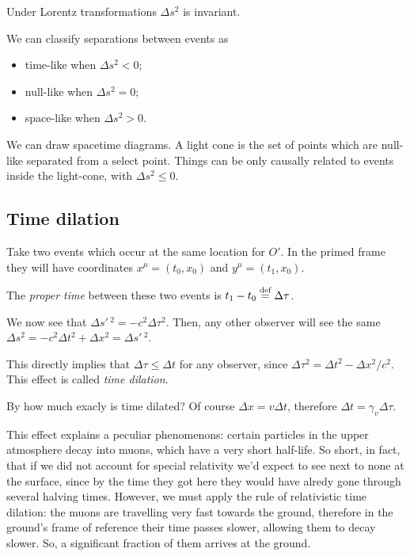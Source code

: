 \documentclass[main.tex]{subfiles}
\begin{document}
\begin{proposition}
Under Lorentz transformations \(\Delta s^2\) is invariant.
\end{proposition}

We can classify separations between events as
%
\begin{itemize}
    \item time-like when \(\Delta s^2 <0\);
    \item null-like when \(\Delta s^2 =0\);
    \item space-like when \(\Delta s^2 >0\).
\end{itemize}

We can draw spacetime diagrams. A light cone is the set of points which are null-like separated from a select point. Things can be only causally related to events inside the light-cone, with \(\Delta s^2 \leq 0\).

\subsection{Time dilation}

Take two events which occur at the same location for \(O'\). In the primed frame they will have coordinates \(x^{\mu} = (t_0, x_0)\) and \(y^\mu = (t_1, x_0)\).

\begin{definition}
    The \emph{proper time} between these two events is \(t_1 - t_0 \stackrel{\text{def}}{=} \Delta \tau\).
\end{definition}

We now see that \(\Delta s'\,^2 = -c^2 \Delta \tau^2\). Then, any other observer will see the same  \(\Delta s^2 = - c^2 \Delta t^2 + \Delta x^2 = \Delta s'\,^2\).

This directly implies that \(\Delta \tau \leq \Delta t\) for any observer, since \(\Delta \tau^2 = \Delta t^2 - \Delta x^2 / c^2\). This effect is called \emph{time dilation}.

By how much exacly is time dilated? Of course \(\Delta x = v \Delta t\), therefore \(\Delta t = \gamma_v \Delta \tau\).

This effect explains a peculiar phenomenons: certain particles in the upper atmosphere decay into muons, which have a very short half-life. So short, in fact, that if we did not account for special relativity we'd expect to see next to none at the surface, since by the time they got here they would have alredy gone through several halving times. 
However, we must apply the rule of relativistic time dilation: the muons are travelling very fast towards the ground, therefore in the ground's frame of reference their time passes slower, allowing them to decay slower. 
So, a significant fraction of them arrives at the ground. 
\end{document}
